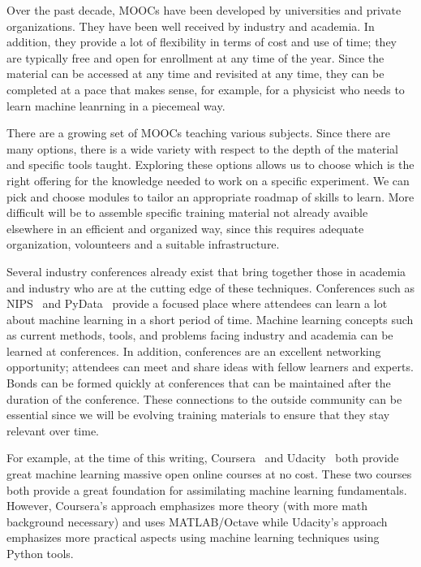 \documentclass[12pt,a4paper]{article}
\begin{document}

Over the past decade, MOOCs have been developed by universities and private organizations. 
They have been well received by industry and academia.
In addition, they provide a lot of flexibility in terms of cost and use of time; 
they are typically free and open for enrollment at any time of the
year. Since the material can be accessed at any time and revisited at any time,
they can be completed at a pace that makes sense, for example, for a physicist
who needs to learn machine leanrning in a piecemeal way.

There are a growing set of MOOCs teaching various subjects. Since there are many
options, there is a wide variety with respect to the depth of the material and
specific tools taught. Exploring these options allows us to choose which is the
right offering for the knowledge needed to work on a specific experiment. We
can pick and choose modules to tailor an appropriate roadmap of skills to learn.
More difficult will be to assemble specific training material not already
avaible elsewhere in an efficient and organized way, since this requires
adequate organization, volounteers and a suitable infrastructure.

Several industry conferences already exist that bring together those in academia
and industry who are at the cutting edge of these techniques. Conferences such
as NIPS~\cite{NIPS} and
PyData~\cite{PyData} provide a focused place where
attendees can learn a lot about machine learning in a short period of time.
Machine learning concepts such as current methods, tools, and problems facing
industry and academia can be learned at conferences. In addition, conferences
are an excellent networking opportunity; attendees can meet and share ideas with
fellow learners and experts. Bonds can be formed quickly at conferences that can
be maintained after the duration of the conference. These connections to the
outside community can be essential since we will be evolving training materials
to ensure that they stay relevant over time.

For example, at the time of this writing,
Coursera~\cite{Coursera} and
Udacity~\cite{Udacity}
both provide great machine learning massive open online courses at no cost.
These two courses both provide a great foundation for assimilating machine learning
fundamentals. However, Coursera's approach emphasizes more theory (with more
math background necessary) and uses MATLAB/Octave while Udacity's approach
emphasizes more practical aspects using machine learning techniques 
using Python tools.
\end{document}

